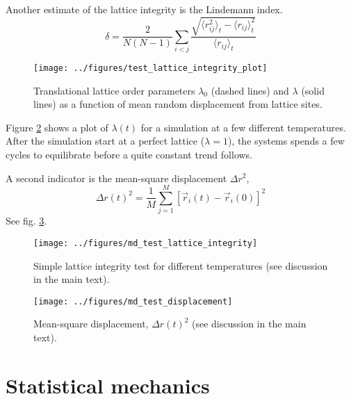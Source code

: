 \documentclass[11pt,bibliography=totoc,index=totoc]{scrbook}   %
\begin{document}
Another estimate of the lattice integrity is the Lindemann index.\cite{Lindemann:1910}
\begin{equation}
  \delta = \frac{2}{N(N-1)} \sum_{i<j} \frac{\sqrt{\langle r_{ij}^2\rangle_t - \langle r_{ij} \rangle^2_t }}{ \langle r_{ij} \rangle_t }
  \label{eq:lindemannindex}
\end{equation}

\begin{figure}[htbp]
  \begin{center}
    \texttt{[image: ../figures/test\_lattice\_integrity\_plot]}
  \end{center}
  \caption{Translational lattice order parameters $\lambda_0$ (dashed lines) and $\lambda$ (solid lines) as a function of mean random displacement from lattice sites.}
  \label{fig:tlotest}
\end{figure}

Figure \ref{fig:md_test_lattice_integrity} shows a plot of $\lambda(t)$ for a simulation at a few different temperatures. 
After the simulation start at a perfect lattice ($\lambda=1$), the systems spends a few cycles to equilibrate before a quite constant trend follows.

A second indicator is the mean-square displacement $\Delta r^2$,
\begin{equation}
  \Delta r(t)^2 = \frac{1}{M}\sum_{j=1}^M [\vec{r}_i(t)-\vec{r}_i(0)]^2
\end{equation}
See fig. \ref{fig:md_test_displacement}.

\begin{figure}[htbp]
  \begin{center}
    \texttt{[image: ../figures/md\_test\_lattice\_integrity]}
  \end{center}
  \caption{Simple lattice integrity test for different temperatures (see discussion in the main text).}
  \label{fig:md_test_lattice_integrity}
\end{figure}

\begin{figure}[htbp]
  \begin{center}
    \texttt{[image: ../figures/md\_test\_displacement]}
  \end{center}
  \caption{Mean-square displacement, $\Delta r(t)^2$ (see discussion in the main text).}
  \label{fig:md_test_displacement}
\end{figure}

\section{Statistical mechanics}
\end{document}
